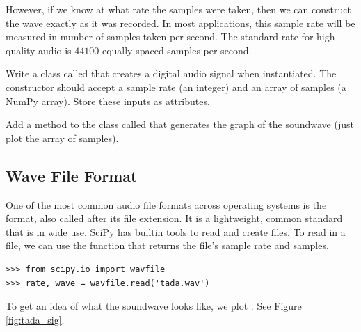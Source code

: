 However, if we know at what rate the samples were taken, then we can construct the wave exactly as it was recorded.
In most applications, this sample rate will be measured in number of samples taken per second.
The standard rate for high quality audio is $44100$ equally spaced samples per second.

\begin{problem}
Write a class called  that creates a digital audio signal when instantiated.
The constructor should accept a sample rate (an integer) and an array of samples (a NumPy array).
Store these inputs as attributes.

Add a method to the class called  that generates the graph of the soundwave (just plot the array of samples). %

\end{problem}

\subsection*{Wave File Format} 

One of the most common audio file formats across operating systems is the  format, also called  after its file extension.
It is a lightweight, common standard that is in wide use.
SciPy has builtin tools to read and create  files.
To read in a  file, we can use the  function that returns the file's sample rate and samples.

\begin{lstlisting}
>>> from scipy.io import wavfile
>>> rate, wave = wavfile.read('tada.wav')
\end{lstlisting}

To get an idea of what the soundwave looks like, we plot .
See Figure \ref{fig:tada_sig}.

